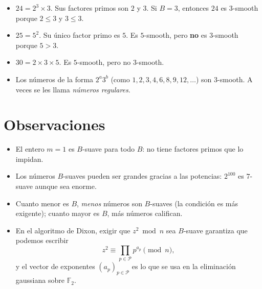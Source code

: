 \begin{ejemplo}
\begin{itemize}
    \item \( 24 = 2^3 \times 3 \). Sus factores primos son \( 2 \) y \( 3 \).  
    Si \( B = 3 \), entonces \( 24 \) es \( 3 \)-smooth porque \( 2 \le 3 \) y \( 3 \le 3 \).

    \item \( 25 = 5^2 \). Su único factor primo es \( 5 \).  
    Es \( 5 \)-smooth, pero \textbf{no} es \( 3 \)-smooth porque \( 5 > 3 \).

    \item \( 30 = 2 \times 3 \times 5 \).  
    Es \( 5 \)-smooth, pero no \( 3 \)-smooth.

    \item Los números de la forma \( 2^a 3^b \) (como \( 1, 2, 3, 4, 6, 8, 9, 12, \dots \)) son \( 3 \)-smooth.  
    A veces se les llama \textit{números regulares}.
\end{itemize}
\end{ejemplo}
\section{Observaciones}

\begin{itemize}
\item El entero $m = 1$ es $B$-suave para todo $B$: no tiene factores primos
      que lo impidan.
\item Los números $B$-suaves pueden ser grandes gracias a las potencias:
      $2^{100}$ es $7$-suave aunque sea enorme.
\item Cuanto menor es $B$, \emph{menos} números son $B$-suaves
      (la condición es más exigente); cuanto mayor es $B$, más números
      califican.
\item En el algoritmo de Dixon, exigir que $z^2 \bmod n$ sea $B$-suave garantiza
      que podemos escribir
      \begin{equation}
      z^2 \equiv \prod_{p \in \mathcal{P}} p^{a_p} \pmod{n},
      \end{equation}
      y el vector de exponentes $(a_p)_{p \in \mathcal{P}}$ es lo que se usa
      en la eliminación gaussiana sobre $\mathbb{F}_2$.
\end{itemize}
